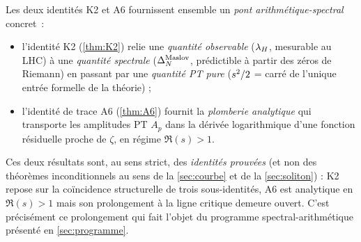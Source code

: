 Les deux identités K2 et A6 fournissent ensemble un \emph{pont arithmétique-spectral} concret~:
\begin{itemize}[nosep,leftmargin=*]
\item l'identité K2 (\ref{thm:K2}) relie une \emph{quantité observable} ($\lambda_H$, mesurable au LHC) à une \emph{quantité spectrale} ($\Delta_N^{\rm Maslov}$, prédictible à partir des zéros de Riemann) en passant par une \emph{quantité PT pure} ($s^{2}/2$ = carré de l'unique entrée formelle de la théorie) ;
\item l'identité de trace A6 (\ref{thm:A6}) fournit la \emph{plomberie analytique} qui transporte les amplitudes PT $A_p$ dans la dérivée logarithmique d'une fonction résiduelle proche de $\zeta$, en régime $\Re(s) > 1$.
\end{itemize}
Ces deux résultats sont, au sens strict, des \emph{identités prouvées} (et non des théorèmes inconditionnels au sens de la \ref{sec:courbe} et de la \ref{sec:soliton}) : K2 repose sur la coïncidence structurelle de trois sous-identités, A6 est analytique en $\Re(s) > 1$ mais son prolongement à la ligne critique demeure ouvert. C'est précisément ce prolongement qui fait l'objet du programme spectral-arithmétique présenté en \ref{sec:programme}.
